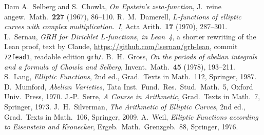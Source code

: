 \documentclass[reqno]{amsart}
\theoremstyle{definition}
\theoremstyle{plain}
\begin{document}
\begin{thebibliography}{Dam}
 A.~Selberg and S.~Chowla, \emph{On Epstein's zeta-function}, J.\ reine angew.\ Math.\ \textbf{227} (1967), 86--110.
 R.~M.~Damerell, \emph{\(L\)-functions of elliptic curves with complex multiplication.~I}, Acta Arith.\ \textbf{17} (1970), 287--301.
 L.~Sernau, \emph{GRH for Dirichlet \(L\)-functions, in Lean~4}, a shorter rewriting of the Lean proof, text by Claude, \url{https://github.com/lsernau/grh-lean}, commit \texttt{72fead1}, readable edition \texttt{grh/}.
 B.~H.~Gross, \emph{On the periods of abelian integrals and a formula of Chowla and Selberg}, Invent.\ Math.\ \textbf{45} (1978), 193--211.
 S.~Lang, \emph{Elliptic Functions}, 2nd ed., Grad.\ Texts in Math.\ 112, Springer, 1987.
 D.~Mumford, \emph{Abelian Varieties}, Tata Inst.\ Fund.\ Res.\ Stud.\ Math.\ 5, Oxford Univ.\ Press, 1970.
 J.-P.~Serre, \emph{A Course in Arithmetic}, Grad.\ Texts in Math.\ 7, Springer, 1973.
 J.~H.~Silverman, \emph{The Arithmetic of Elliptic Curves}, 2nd ed., Grad.\ Texts in Math.\ 106, Springer, 2009.
 A.~Weil, \emph{Elliptic Functions according to Eisenstein and Kronecker}, Ergeb.\ Math.\ Grenzgeb.\ 88, Springer, 1976.
\end{thebibliography}
\end{document}
